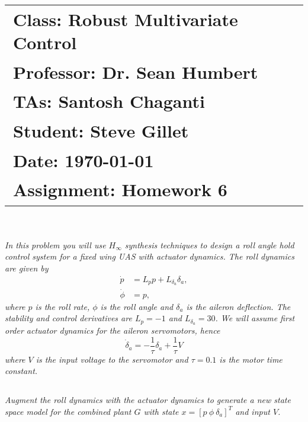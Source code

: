 \documentclass{article}
\begin{document}
\title{
    \begin{tabular}{@{}l@{}}
        \textbf{Class:} Robust Multivariate Control \\
        \textbf{Professor:} Dr. Sean Humbert \\
        \textbf{TAs:} Santosh Chaganti \\
        \textbf{Student:} Steve Gillet \\
        \textbf{Date:} \today \\
        \textbf{Assignment:} Homework 6
    \end{tabular}
}

\author{}
\date{}

\maketitle

\section{}

\textit{
In this problem you will use $H_\infty$ synthesis techniques to design a roll angle hold control system for a fixed wing UAS with actuator dynamics. The roll dynamics are given by
\[
\begin{aligned}
    \dot{p} &= L_p p + L_{\delta_a} \delta_a, \\
    \dot{\phi} &= p,
\end{aligned}
\]
where $p$ is the roll rate, $\phi$ is the roll angle and $\delta_a$ is the aileron deflection. The stability and control derivatives are $L_p = -1$ and $L_{\delta_a} = 30$. We will assume first order actuator dynamics for the aileron servomotors, hence
\[
\dot{\delta}_a = -\frac{1}{\tau} \delta_a + \frac{1}{\tau} V
\]
where $V$ is the input voltage to the servomotor and $\tau = 0.1$ is the motor time constant.
}

\subsection{}

\textit{Augment the roll dynamics with the actuator dynamics to generate a new state space model for the combined plant $G$ with state $x = [p\ \phi\ \delta_a]^T$ and input $V$.}
\end{document}
